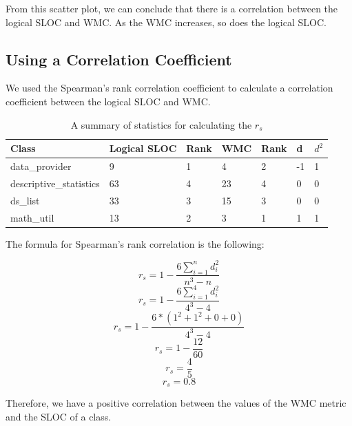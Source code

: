\documentclass[11pt]{article}
\begin{document}
From this scatter plot, we can conclude that there is a correlation between the logical SLOC and WMC. As the WMC increases, so does the logical SLOC.

\newpage

\subsection{Using a Correlation Coefficient}

We used the Spearman's rank correlation coefficient to calculate a correlation coefficient between the logical SLOC and WMC.\newline

\begin{table}[ht!]
\centering
\begin{tabular}{|l|l|l|l|l|l|l|}
\hline
Class                   & Logical SLOC & Rank & WMC & Rank & d  & $ d^{2} $ \\ \hline
data\_provider          & 9            & 1    & 4   & 2    & -1 & 1                    \\ \hline
descriptive\_statistics & 63           & 4    & 23  & 4    & 0  & 0                    \\ \hline
ds\_list                & 33           & 3    & 15  & 3    & 0  & 0                    \\ \hline
math\_util              & 13           & 2    & 3   & 1    & 1  & 1                    \\ \hline
\end{tabular}
\caption{A summary of statistics for calculating the $ r_{s} $}
\end{table}

The formula for Spearman's rank correlation is the following:

$$ r_{s} = 1 - \frac{6\sum\limits_{i=1}^{n} d_{i}^{2}}{n^{3} - n} $$ 
$$ r_{s} = 1 - \frac{6\sum\limits_{i=1}^{4} d_{i}^{2}}{4^{3} - 4} $$ 
$$ r_{s} = 1 - \frac{6*(1^{2}+1^{2}+0+0)}{4^{3} - 4} $$
$$ r_{s} = 1 - \frac{12}{60} $$
$$ r_{s} = \frac{4}{5} $$
$$ r_{s} = 0.8 $$

Therefore, we have a positive correlation between the values of the WMC metric and the SLOC of a class.

\newpage

\printglossaries

\newpage



\end{document}
